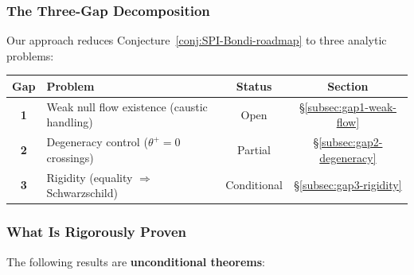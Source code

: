 \subsubsection{The Three-Gap Decomposition}

Our approach reduces Conjecture~\ref{conj:SPI-Bondi-roadmap} to three analytic problems:

\begin{center}
\renewcommand{\arraystretch}{1.3}
\begin{tabular}{|c|l|c|c|}
\hline
\textbf{Gap} & \textbf{Problem} & \textbf{Status} & \textbf{Section} \\
\hline
\textbf{1} & Weak null flow existence (caustic handling) & Open & \S\ref{subsec:gap1-weak-flow} \\
\textbf{2} & Degeneracy control ($\theta^+ = 0$ crossings) & Partial & \S\ref{subsec:gap2-degeneracy} \\
\textbf{3} & Rigidity (equality $\Rightarrow$ Schwarzschild) & Conditional & \S\ref{subsec:gap3-rigidity} \\
\hline
\end{tabular}
\end{center}

\subsubsection{What Is Rigorously Proven}

The following results are \textbf{unconditional theorems}:

